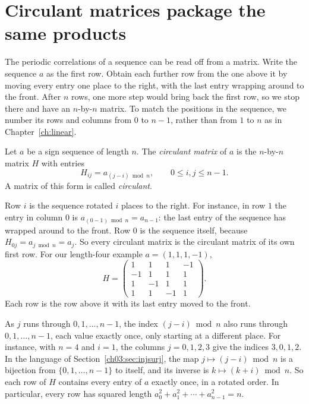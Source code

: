 \section{Circulant matrices package the same products}\label{ch14:sec:circulant}
The periodic correlations of a sequence can be read off from a matrix. Write the sequence $a$ as the first row. Obtain each further row from the one above it by moving every entry one place to the right, with the last entry wrapping around to the front. After $n$ rows, one more step would bring back the first row, so we stop there and have an $n$-by-$n$ matrix. To match the positions in the sequence, we number its rows and columns from $0$ to $n-1$, rather than from $1$ to $n$ as in Chapter~\ref{ch:linear}.

\par\noindent\begin{minipage}{\linewidth}
\begin{definition}\label{ch14:def:circulant}
Let $a$ be a sign sequence of length $n$. The \emph{circulant matrix} of $a$ is the $n$-by-$n$ matrix $H$ with entries
\[
H_{ij}=a_{(j-i)\bmod n},\qquad0\le i,j\le n-1.
\]
A matrix of this form is called \emph{circulant}.
\end{definition}
\end{minipage}\par

Row $i$ is the sequence rotated $i$ places to the right. For instance, in row $1$ the entry in column $0$ is $a_{(0-1)\bmod n}=a_{n-1}$: the last entry of the sequence has wrapped around to the front. Row $0$ is the sequence itself, because $H_{0j}=a_{j\bmod n}=a_j$. So every circulant matrix is the circulant matrix of its own first row. For our length-four example $a=(1,1,1,-1)$,
\[
H=\begin{pmatrix}
1&1&1&-1\\
-1&1&1&1\\
1&-1&1&1\\
1&1&-1&1
\end{pmatrix}.
\]
Each row is the row above it with its last entry moved to the front.

As $j$ runs through $0,1,\ldots,n-1$, the index $(j-i)\bmod n$ also runs through $0,1,\ldots,n-1$, each value exactly once, only starting at a different place. For instance, with $n=4$ and $i=1$, the columns $j=0,1,2,3$ give the indices $3,0,1,2$. In the language of Section~\ref{ch03:sec:injsurj}, the map $j\mapsto(j-i)\bmod n$ is a bijection from $\{0,1,\ldots,n-1\}$ to itself, and its inverse is $k\mapsto(k+i)\bmod n$. So each row of $H$ contains every entry of $a$ exactly once, in a rotated order. In particular, every row has squared length $a_0^2+a_1^2+\cdots+a_{n-1}^2=n$.

